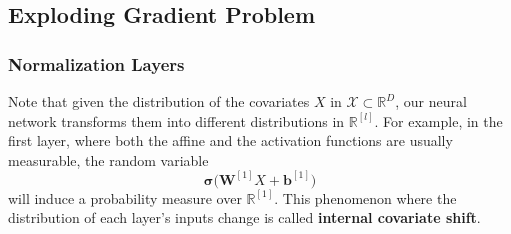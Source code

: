 \documentclass{article}
\theoremstyle{definition}
\theoremstyle{remark}
\theoremstyle{definition}
\begin{document}
\subsection{Exploding Gradient Problem}

\subsubsection{Normalization Layers}
Note that given the distribution of the covariates $X$ in $\mathcal{X} \subset \mathbb{R}^D$, our neural network transforms them into different distributions in $\mathbb{R}^{[l]}$. For example, in the first layer, where both the affine and the activation functions are usually measurable, the random variable 
\[\boldsymbol{\sigma} \big( \mathbf{W}^{[1]} X + \mathbf{b}^{[1]} \big)\]
will induce a probability measure over $\mathbb{R}^{[1]}$. This phenomenon where the distribution of each layer's inputs change is called \textbf{internal covariate shift}. 
\end{document}
